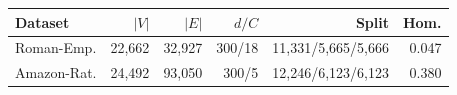 \begin{tabular*}{\linewidth}{@{\extracolsep{\fill}}lrrrrr@{}}
\toprule
Dataset & $|V|$ & $|E|$ & $d/C$ & Split & Hom. \\
\midrule
Roman-Emp. & 22,662 & 32,927 & 300/18 & 11,331/5,665/5,666 & 0.047 \\
Amazon-Rat. & 24,492 & 93,050 & 300/5 & 12,246/6,123/6,123 & 0.380 \\
\bottomrule
\end{tabular*}
